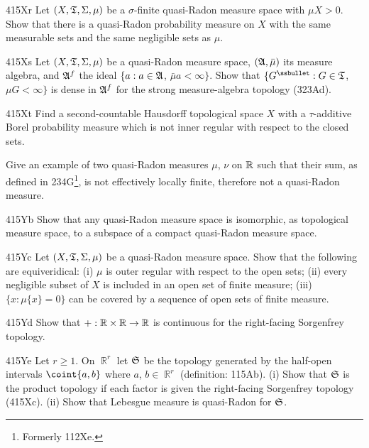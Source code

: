 {\spheader 415Xr Let $(X,\frak T,\Sigma,\mu)$ be a $\sigma$-finite
quasi-Radon measure space with $\mu X>0$.   Show that there is a
quasi-Radon probability measure on $X$ with the same measurable sets and the same negligible sets as $\mu$.

\spheader 415Xs Let $(X,\frak T,\Sigma,\mu)$ be a quasi-Radon measure
space, $(\frak A,\bar\mu)$ its measure algebra, and $\frak A^f$ the ideal
$\{a:a\in\frak A$, $\bar\mu a<\infty\}$.   Show that
$\{G^{\ssbullet}:G\in\frak T$, $\mu G<\infty\}$ is dense in $\frak A^f$ for
the strong measure-algebra topology (323Ad).

\spheader 415Xt
Find a second-countable Hausdorff topological space $X$
with a $\tau$-additive Borel probability measure which is not inner 
regular with respect to the closed sets.

Give an example of two quasi-Radon measures $\mu$, $\nu$
on $\Bbb R$ such that their sum, as defined in
234G\footnote{Formerly 1{}12Xe.}, %
is not effectively locally finite, therefore not a quasi-Radon measure.

\spheader 415Yb
Show that any quasi-Radon measure space is isomorphic, as topological
measure space, to a subspace of a compact quasi-Radon measure space.

\spheader 415Yc Let $(X,\frak T,\Sigma,\mu)$ be a quasi-Radon measure
space.   Show that the following are equiveridical:  (i) $\mu$ is outer
regular with respect to the open sets;  (ii) every negligible subset of
$X$ is included in an open set of finite measure;   (iii)
$\{x:\mu\{x\}=0\}$ can be covered by a sequence of open sets of finite
measure.

\spheader 415Yd Show that $+:\Bbb R\times\Bbb R\to\Bbb R$ is continuous
for the right-facing Sorgenfrey topology.

\spheader 415Ye Let $r\ge 1$.   On $\BbbR^r$ let $\frak S$ be the
topology generated by the half-open intervals $\coint{a,b}$ where $a$,
$b\in\BbbR^r$ (definition:  115Ab).   (i) Show that $\frak S$ is the
product topology if each
factor is given the right-facing Sorgenfrey topology (415Xc).   (ii)
Show that Lebesgue measure is quasi-Radon for $\frak S$.   

}
